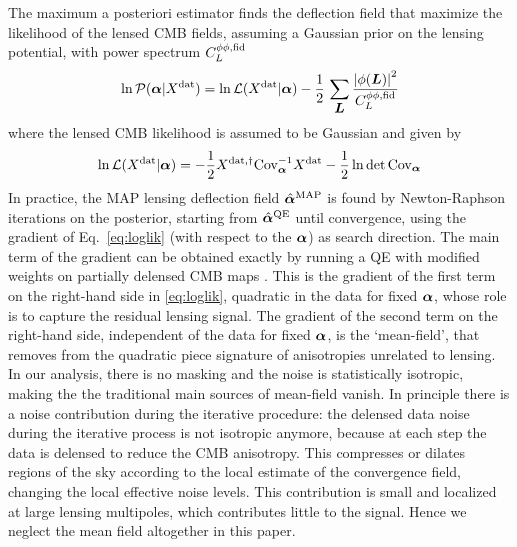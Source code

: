 \documentclass[prd, superscriptaddress, tightenlines, longbibliography, nofootinbib, eqsecnum, amsfonts, amsmath, floatfix, twocolumn, notitlepage]{revtex4-2}
\newcommand{\Cov}[0]{ {\rm{Cov}} }
\begin{document}
The maximum a posteriori estimator finds the deflection field that maximize the likelihood of the lensed CMB fields, assuming a Gaussian prior on the lensing potential, with power spectrum $C_L^{\phi\phi, \rm fid}$
\begin{equation}
    \ln \mathcal{P}({\boldsymbol{\alpha}} | X^{\rm dat}) = \ln \mathcal{L}( X^{\rm dat} | {\boldsymbol{\alpha}}) - \frac{1}{2} \, \sum_{\mbox{\boldmath{$L$}}} \frac{\left|\phi({\mbox{\boldmath{$L$}}})\right|^2}{C_L^{\phi\phi, \rm fid}}
\end{equation}
where the lensed CMB likelihood is assumed to be Gaussian and given by 
\begin{equation}\label{eq:loglik}
    \ln \mathcal{L}( X^{\rm dat} | \valpha) = -\frac{1}{2} X^{\rm dat, \dagger }\Cov_\valpha^{-1} X^{\rm dat} - \frac{1}{2}\ln \det \Cov_\valpha
\end{equation}
In practice, the MAP lensing deflection field $\hat {{\boldsymbol{\alpha}}}^{\rm MAP}$ is found by Newton-Raphson iterations on the posterior, starting from $\hat {{\boldsymbol{\alpha}}}^{\rm QE}$ until convergence, using the gradient of Eq.~\eqref{eq:loglik} (with respect to the ${\boldsymbol{\alpha}}$) as search direction. The main term of the gradient can be obtained exactly by running a QE with modified weights on partially delensed CMB maps  \cite[see][for more details]{Carron:2017mqf}. This is the gradient of the first term on the right-hand side in \eqref{eq:loglik}, quadratic in the data for fixed ${\boldsymbol{\alpha}}$, whose role is to capture the residual lensing signal. The gradient of the second term on the right-hand side, independent of the data for fixed ${\boldsymbol{\alpha}}$, is the `mean-field', that removes from the quadratic piece signature of anisotropies unrelated to lensing. In our analysis, there is no masking and the noise is statistically isotropic, making the the traditional main sources of mean-field vanish. In principle there is a noise contribution during the iterative procedure: the delensed data noise during the iterative process is not isotropic anymore, because at each step the data is delensed to reduce the CMB anisotropy. This compresses or dilates regions of the sky according to the local estimate of the convergence field, changing the local effective noise levels. This contribution is small and localized at large lensing multipoles, which contributes little to the signal. Hence we neglect the mean field altogether in this paper. 
\end{document}

